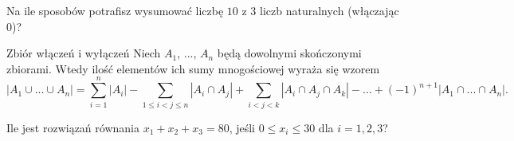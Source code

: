 \documentclass{../uoom}
\begin{document}
%
%
%
%
%

\begin{zadanie}
  Na ile sposobów potrafisz wysumować liczbę $10$ z $3$ liczb naturalnych (włączając $0$)? 
\end{zadanie}

\begin{mybox}{Zbiór włączeń i wyłączeń}
  Niech $A_1$, ..., $A_n$ będą dowolnymi skończonymi zbiorami. Wtedy ilość elementów ich sumy mnogościowej wyraża się wzorem
  $$|A_1\cup...\cup A_n|=\sum_{i=1}^n|A_i|-\sum_{1\leq i< j\leq n}|A_i\cap A_j|+\sum_{i<j<k}|A_i\cap A_j\cap A_k|-...+(-1)^{n+1}|A_1\cap...\cap A_n|.$$
\end{mybox}

\begin{zadanie}
  Ile jest rozwiązań równania $x_1+x_2+x_3=80$, jeśli $0\leq x_i\leq 30$ dla $i=1,2,3$?
\end{zadanie}

\end{document}
